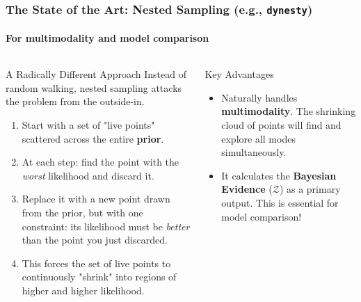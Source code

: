 \documentclass[aspectratio=169]{beamer}
\newcommand{\keyterm}[1]{\textbf{\textcolor{blue!70!black}{#1}}}
\begin{document}
\begin{frame}
    \frametitle{The State of the Art: Nested Sampling (e.g., \texttt{dynesty})}
    \framesubtitle{For multimodality and model comparison}
    
    \begin{columns}[T]
        \begin{block}{A Radically Different Approach}
            Instead of random walking, nested sampling attacks the problem from the outside-in.
            \begin{enumerate}
                \item Start with a set of "live points" scattered across the entire \keyterm{prior}.
                \item At each step: find the point with the \textit{worst} likelihood and discard it.
                \item Replace it with a new point drawn from the prior, but with one constraint: its likelihood must be \textit{better} than the point you just discarded.
                \item This forces the set of live points to continuously "shrink" into regions of higher and higher likelihood.
            \end{enumerate}
        \end{block}
        
        \begin{block}{Key Advantages}
            \begin{itemize}
                \item Naturally handles \keyterm{multimodality}. The shrinking cloud of points will find and explore all modes simultaneously.
                \item It calculates the \keyterm{Bayesian Evidence} ($\mathcal{Z}$) as a primary output. This is essential for model comparison!
            \end{itemize}
        \end{block}
        

\end{columns}
\end{frame}
\end{document}
